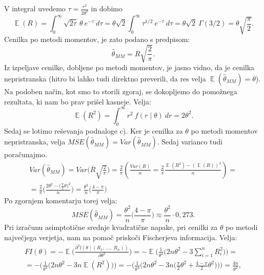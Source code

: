 \documentclass{article}
\DeclareMathOperator{\EX}{\mathbb{E}}
\begin{document}
V integral uvedemo $\tau = \frac{r^{2}}{2 \theta^{2}}$ in dobimo
$$
\EX(R) = \int_{0}^{\infty}{\sqrt{2 \tau}~\theta ~e^{-\tau}~ d \tau} = \theta \sqrt{2}\int_{0}^{\infty}{\tau^{1/2}~e^{-\tau}~ d \tau} = \theta\sqrt{2}~\Gamma(3/2) = \theta \sqrt{\frac{\pi}{2}}.
$$
Cenilka po metodi momentov, je zato podano s predpisom:
$$
\hat{\theta}_{MM} = \overline{R} \sqrt{\frac{2}{\pi}}.
$$
Iz izpeljave cenilke, dobljene po metodi momentov, je jasno vidno, da je cenilka nepristranska (hitro bi lahko tudi direktno preverili, da res velja $\EX(\hat{\theta}_{MM}) = \theta$).
\newline
Na podoben način, kot smo to storili zgoraj, se dokopljemo do pomožnega rezultata, ki nam bo prav prišel kasneje. Velja:
$$
\EX(R^2) = \int_{0}^{\infty}{r^2~f(r \mid \theta)~dr}= 2 \theta^2.
$$
\newline
\newline
Sedaj se lotimo reševanja podnaloge c). Ker je cenilka za $\theta$ po metodi momentov nepristranska, velja $MSE(\hat{\theta}_{MM}) = Var(\hat{\theta}_{MM})$. Sedaj varianco tudi poračunajmo.
\begin{equation*}
    \begin{split}
    Var(\hat{\theta}_{MM}) = Var\bigg(\overline{R} \sqrt{\frac{2}{\pi}}\bigg) = \frac{2}{\pi} \left(\frac{Var(R)}{n} = \frac{2}{\pi}\frac{\EX(R^2) - (\EX(R))^2}{n}\right) = \\
    = \frac{2}{\pi}\bigg(\frac{2 \theta^2 - \big(\frac{\pi}{2} \theta\big)^2}{n}\bigg) = \frac{\theta^2}{n} \bigg(\frac{4 - \pi}{\pi}\bigg)
    \end{split}
\end{equation*}
Po zgornjem komentarju torej velja:
$$
MSE(\hat{\theta}_{MM}) = \frac{\theta^2}{n} \bigg(\frac{4 - \pi}{\pi}\bigg)\approx \frac{\theta^2}{n} \cdot 0{,}273.
$$
Pri izračunu asimptotične srednje kvadratične napake, pri cenilki za $\theta$ po metodi največjega verjetja, nam na pomoč priskoči Fischerjeva informacija. 
Velja:
\begin{equation*}
    \begin{split}
    FI(\theta) = - \EX\bigg(\frac{\partial^2 l(\theta \mid (R_1,~\dots,~R_n))}{\partial \theta^2}\bigg) = -\EX\bigg(\frac{1}{\theta^4}\bigg(2n\theta^2 - 3 \sum_{i=1}^{n}{R_i^2}\bigg)\bigg) = \\
    = -\bigg(\frac{1}{\theta^4}\bigg(2n \theta^2 - 3n \EX(R^2)\bigg)\bigg) = -\bigg(\frac{1}{\theta^4}\bigg(2n \theta^2 - 3n \Big(\frac{\pi}{2} \theta^2 + \frac{4- \pi}{2}\theta^2\Big)\bigg)\bigg) = \frac{4n}{\theta^2}, 
    \end{split}
\end{equation*}
\end{document}
